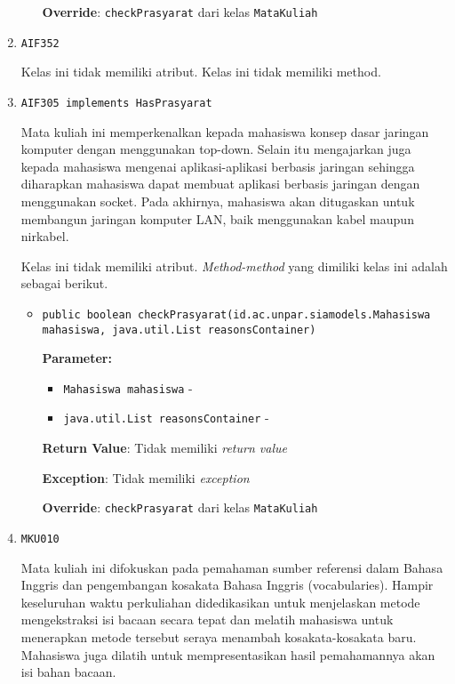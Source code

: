 \documentclass{article}
\begin{document}
\begin{enumerate}
\begin{itemize}
\textbf{Override}: \texttt{checkPrasyarat} dari kelas \texttt{MataKuliah}

\end{itemize}
\item \texttt{AIF352}



Kelas ini tidak memiliki atribut. Kelas ini tidak memiliki method. \item \texttt{AIF305 implements HasPrasyarat}

Mata kuliah ini memperkenalkan kepada mahasiswa konsep dasar jaringan
 komputer dengan menggunakan top-down. Selain itu mengajarkan juga kepada
 mahasiswa mengenai aplikasi-aplikasi berbasis jaringan sehingga diharapkan
 mahasiswa dapat membuat aplikasi berbasis jaringan dengan menggunakan socket.
 Pada akhirnya, mahasiswa akan ditugaskan untuk membangun jaringan komputer
 LAN, baik menggunakan kabel maupun nirkabel.

Kelas ini tidak memiliki atribut. \textit{Method-method} yang dimiliki kelas ini adalah sebagai berikut.
\begin{itemize}
\item \texttt{public boolean checkPrasyarat(id.ac.unpar.siamodels.Mahasiswa mahasiswa, java.util.List reasonsContainer)}



\textbf{Parameter:}
\begin{itemize}
\item \texttt{Mahasiswa mahasiswa} - 
\item \texttt{java.util.List reasonsContainer} - 
\end{itemize}
\textbf{Return Value}: Tidak memiliki \textit{return value}

\textbf{Exception}: Tidak memiliki \textit{exception}

\textbf{Override}: \texttt{checkPrasyarat} dari kelas \texttt{MataKuliah}

\end{itemize}
\item \texttt{MKU010}

Mata kuliah ini difokuskan pada pemahaman sumber referensi dalam Bahasa Inggris dan 
 pengembangan kosakata Bahasa Inggris (vocabularies). Hampir keseluruhan waktu perkuliahan 
 didedikasikan untuk menjelaskan metode mengekstraksi isi bacaan secara tepat dan melatih 
 mahasiswa untuk menerapkan metode tersebut seraya menambah kosakata-kosakata baru. 
 Mahasiswa juga dilatih untuk mempresentasikan hasil pemahamannya akan isi bahan bacaan.


\end{enumerate}
\end{document}
